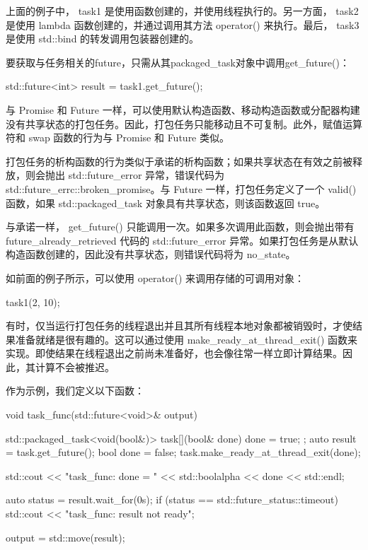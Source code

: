 上面的例子中， task1 是使用函数创建的，并使用线程执行的。另一方面， task2 是使用 lambda 函数创建的，并通过调用其方法 operator() 来执行。最后， task3 是使用 std::bind 的转发调用包装器创建的。

要获取与任务相关的future，只需从其packaged\_task对象中调用get\_future()：

\begin{cpp}
std::future<int> result = task1.get_future();
\end{cpp}

与 Promise 和 Future 一样，可以使用默认构造函数、移动构造函数或分配器构建没有共享状态的打包任务。因此，打包任务只能移动且不可复制。此外，赋值运算符和 swap 函数的行为与 Promise 和 Future 类似。

打包任务的析构函数的行为类似于承诺的析构函数；如果共享状态在有效之前被释放，则会抛出 std::future\_error 异常，错误代码为 std::future\_errc::broken\_promise。与 Future 一样，打包任务定义了一个 valid() 函数，如果 std::packaged\_task 对象具有共享状态，则该函数返回 true。

与承诺一样， get\_future() 只能调用一次。如果多次调用此函数，则会抛出带有 future\_already\_retrieved 代码的 std::future\_error 异常。如果打包任务是从默认构造函数创建的，因此没有共享状态，则错误代码将为 no\_state。

如前面的例子所示，可以使用 operator() 来调用存储的可调用对象：

\begin{cpp}
task1(2, 10);
\end{cpp}

有时，仅当运行打包任务的线程退出并且其所有线程本地对象都被销毁时，才使结果准备就绪是很有趣的。这可以通过使用 make\_ready\_at\_thread\_exit() 函数来实现。即使结果在线程退出之前尚未准备好，也会像往常一样立即计算结果。因此，其计算不会被推迟。

作为示例，我们定义以下函数：

\begin{cpp}
void task_func(std::future<void>& output) {
    std::packaged_task<void(bool&)> task{[](bool& done){
            done = true;
    }};
    auto result = task.get_future();
    bool done = false;
    task.make_ready_at_thread_exit(done);

    std::cout << "task_func: done = "
              << std::boolalpha << done << std::endl;

    auto status = result.wait_for(0s);
    if (status == std::future_status::timeout)
        std::cout << "task_func: result not ready\n";

    output = std::move(result);
}
\end{cpp}

